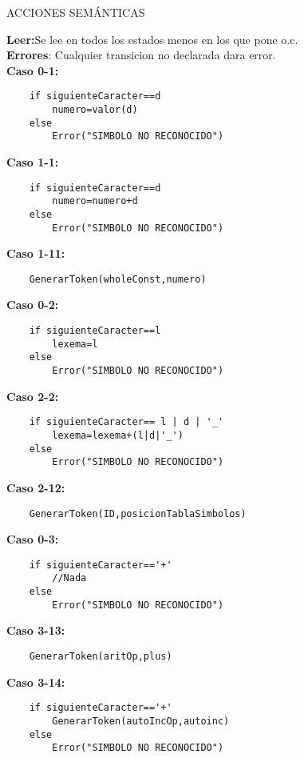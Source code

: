 \documentclass{article}
\begin{document}
\begin{center}
ACCIONES SEMÁNTICAS\\
\end{center}
\vspace{2cm}

\noindent
\textbf{Leer:}Se lee en todos los estados menos en los que pone o.c.\\
\textbf{Errores}:  Cualquier transicion no declarada dara error.\\

\textbf{Caso 0-1:}
\begin{verbatim}
    if siguienteCaracter==d
        numero=valor(d)
    else
        Error("SIMBOLO NO RECONOCIDO")
\end{verbatim}

\textbf{Caso 1-1:}
\begin{verbatim}
    if siguienteCaracter==d
        numero=numero+d
    else 
        Error("SIMBOLO NO RECONOCIDO")
\end{verbatim}

\textbf{Caso 1-11:}
\begin{verbatim}
    GenerarToken(wholeConst,numero)
\end{verbatim}

\textbf{Caso 0-2:}
\begin{verbatim}
    if siguienteCaracter==l 
        lexema=l
    else 
        Error("SIMBOLO NO RECONOCIDO")
\end{verbatim}

\textbf{Caso 2-2:}
\begin{verbatim}
    if siguienteCaracter== l | d | '_' 
        lexema=lexema+(l|d|'_')
    else 
        Error("SIMBOLO NO RECONOCIDO")
\end{verbatim}

\textbf{Caso 2-12:}
\begin{verbatim}
    GenerarToken(ID,posicionTablaSimbolos)
\end{verbatim}

\textbf{Caso 0-3:}
\begin{verbatim}
    if siguienteCaracter=='+'
        //Nada
    else
        Error("SIMBOLO NO RECONOCIDO")
\end{verbatim}

\textbf{Caso 3-13:}
\begin{verbatim}
    GenerarToken(aritOp,plus)
\end{verbatim}

\textbf{Caso 3-14:}
\begin{verbatim}
    if siguienteCaracter=='+'
        GenerarToken(autoIncOp,autoinc)
    else 
        Error("SIMBOLO NO RECONOCIDO")
\end{verbatim}
\end{document}
